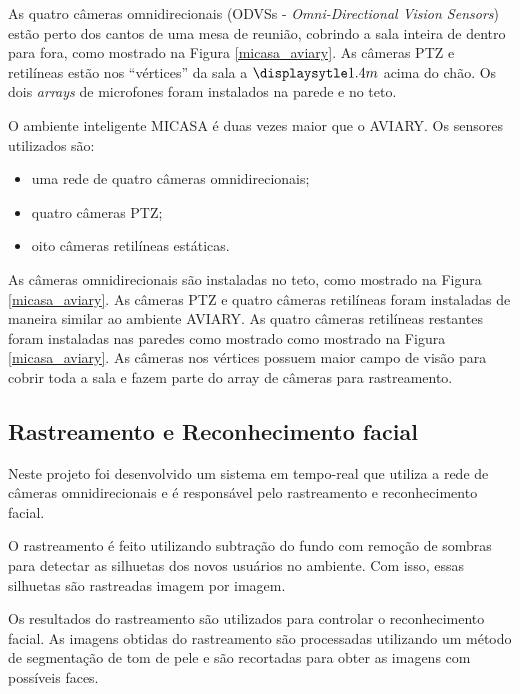 As quatro câmeras omnidirecionais (ODVSs - \textit{Omni-Directional Vision Sensors}) estão perto dos cantos de uma mesa de reunião, cobrindo a sala inteira de dentro para fora, como mostrado na Figura \ref{micasa_aviary}. As câmeras PTZ e retilíneas estão nos ``vértices'' da sala a $\displaysytle 1.4m$ acima do chão. Os dois \textit{arrays} de microfones foram instalados na parede e no teto.


O ambiente inteligente MICASA é duas vezes maior que o AVIARY. Os sensores utilizados são:
	
	\begin{itemize}
		\item uma rede de quatro câmeras omnidirecionais;
		\item quatro câmeras PTZ;
		\item oito câmeras retilíneas estáticas.
	\end{itemize}

As câmeras omnidirecionais são instaladas no teto, como mostrado na Figura \ref{micasa_aviary}. As câmeras PTZ e quatro câmeras retilíneas foram instaladas de maneira similar ao ambiente AVIARY. As quatro câmeras retilíneas restantes foram instaladas nas paredes como mostrado como mostrado na Figura \ref{micasa_aviary}. As câmeras nos vértices possuem maior campo de visão para cobrir toda a sala e fazem parte do array de câmeras para rastreamento.

\subsection{Rastreamento e Reconhecimento facial}
 
Neste projeto foi desenvolvido um sistema em tempo-real que utiliza a rede de câmeras omnidirecionais e é responsável pelo rastreamento e reconhecimento facial. 

O rastreamento é feito utilizando subtração do fundo com remoção de sombras para detectar as silhuetas dos novos usuários no ambiente.  Com isso, essas silhuetas são rastreadas imagem por imagem.

Os resultados do rastreamento são utilizados para controlar o reconhecimento facial. As imagens obtidas do rastreamento são processadas utilizando um método de segmentação de tom de pele e são recortadas para obter as imagens com possíveis faces. 

